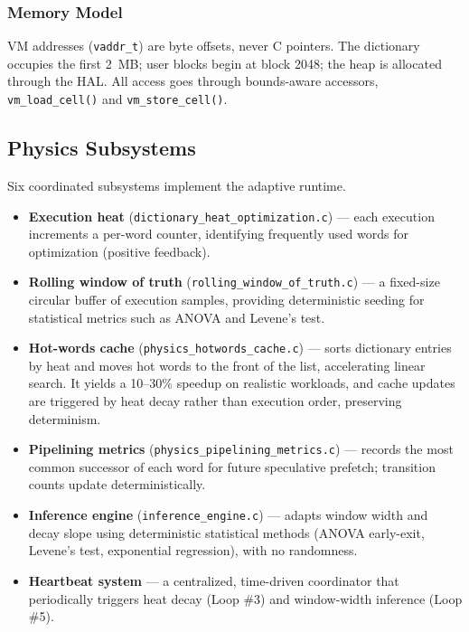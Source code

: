 \subsubsection{Memory Model}

VM addresses (\texttt{vaddr\_t}) are byte offsets, never C pointers. The
dictionary occupies the first 2~MB; user blocks begin at block 2048; the heap
is allocated through the HAL. All access goes through bounds-aware accessors,
\texttt{vm\_load\_cell()} and \texttt{vm\_store\_cell()}.

\subsection{Physics Subsystems}

Six coordinated subsystems implement the adaptive runtime.

\begin{itemize}
  \item \textbf{Execution heat} (\texttt{dictionary\_heat\_optimization.c}) ---
    each execution increments a per-word counter, identifying frequently used
    words for optimization (positive feedback).
  \item \textbf{Rolling window of truth}
    (\texttt{rolling\_window\_of\_truth.c}) --- a fixed-size circular buffer of
    execution samples, providing deterministic seeding for statistical metrics
    such as ANOVA and Levene's test.
  \item \textbf{Hot-words cache} (\texttt{physics\_hotwords\_cache.c}) --- sorts
    dictionary entries by heat and moves hot words to the front of the list,
    accelerating linear search. It yields a 10--30\% speedup on realistic
    workloads, and cache updates are triggered by heat decay rather than
    execution order, preserving determinism.
  \item \textbf{Pipelining metrics}
    (\texttt{physics\_pipelining\_metrics.c}) --- records the most common
    successor of each word for future speculative prefetch; transition counts
    update deterministically.
  \item \textbf{Inference engine} (\texttt{inference\_engine.c}) --- adapts
    window width and decay slope using deterministic statistical methods (ANOVA
    early-exit, Levene's test, exponential regression), with no randomness.
  \item \textbf{Heartbeat system} --- a centralized, time-driven coordinator
    that periodically triggers heat decay (Loop \#3) and window-width inference
    (Loop \#5).
\end{itemize}

